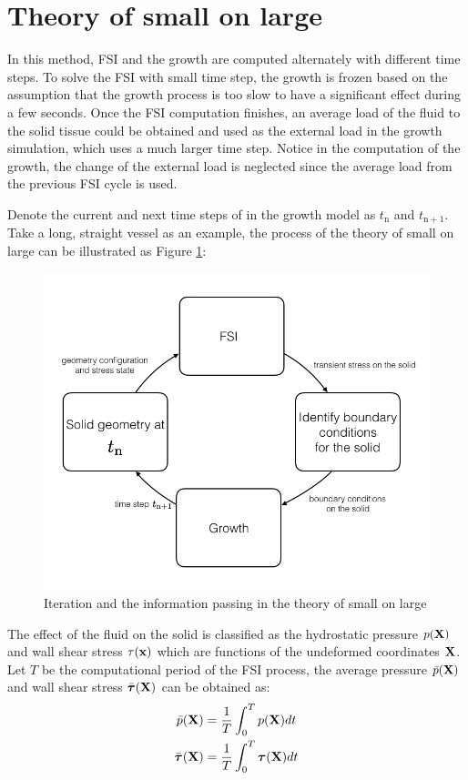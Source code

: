 \section{Theory of small on large}
In this method, FSI and the growth are computed alternately with different time steps. To solve the FSI with small time step, the growth is frozen based on the assumption that the growth process is too slow to have a significant effect during a few seconds. Once the FSI computation finishes, an average load of the fluid to the solid tissue could be obtained and used as the external load in the growth simulation, which uses a much larger time step. Notice in the computation of the growth, the change of the external load is neglected since the average load from the previous FSI cycle is used.

Denote the current and next time steps of in the growth model as $t_\mathrm{n}$ and $t_\mathrm{n+1}$. Take a long, straight vessel as an example, the process of the theory of small on large can be illustrated as Figure \ref{fig:smallOnLarge}:
\begin{figure}[H]
   \centering
   \includegraphics[width=.6\textwidth]{./figures/smallOnLarge.png} %
   \caption{Iteration and the information passing in the theory of small on large}
   \label{fig:smallOnLarge}
\end{figure}

The effect of the fluid on the solid is classified as the hydrostatic pressure $p(\bold{X})$ and wall shear stress $\tau(\bold{x})$ which are functions of the undeformed coordinates $\bold{X}$. Let $T$ be the computational period of the FSI process, the average pressure $\bar{p}(\bold{X})$ and wall shear stress $\bar{\boldsymbol{\tau}}(\bold{X})$ can be obtained as:
\begin{subequations}
\begin{align}
\bar{p}(\bold{X}) &= \frac{1}{T}\int_0^T p(\bold{X}) dt\\
\bar{\boldsymbol{\tau}}(\bold{X}) &= \frac{1}{T}\int_0^T \boldsymbol{\tau}(\bold{X}) dt
\end{align}
\end{subequations}